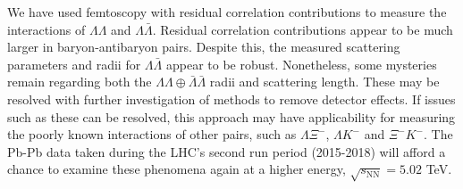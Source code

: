 We have used femtoscopy with residual correlation contributions to measure the interactions of $\Lambda\Lambda$ and $\Lambda\bar{\Lambda}$.
Residual correlation contributions appear to be much larger in baryon-antibaryon pairs.
Despite this, the measured scattering parameters and radii for $\Lambda\bar{\Lambda}$ appear to be robust.
Nonetheless, some mysteries remain regarding both the $\Lambda\Lambda\oplus\bar{\Lambda}\bar{\Lambda}$ radii and scattering length.
These may be resolved with further investigation of methods to remove detector effects.
If issues such as these can be resolved, this approach may have applicability for measuring the poorly known interactions of other pairs, such as $\Lambda\Xi^-$, $\Lambda K^-$ and $\Xi^-K^-$.
The Pb-Pb data taken during the LHC's second run period (2015-2018) will afford a chance to examine these phenomena again at a higher energy, $\sqrt{s_\mathrm{NN}} = 5.02$ TeV.


